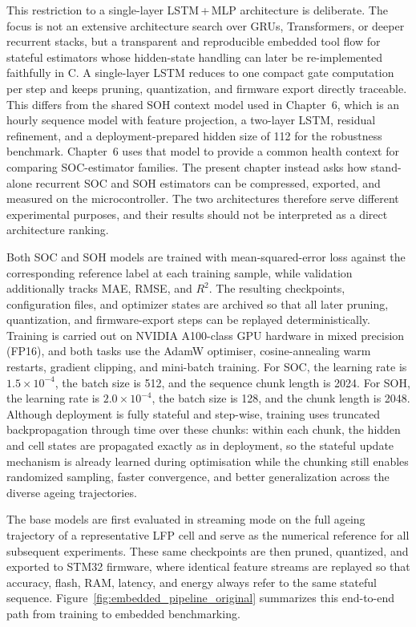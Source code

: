 \documentclass[
    a4paper,
    12pt,
    titlepage,
    bibliography=totoc,
    twoside=on,
    parskip=false,
    numbers=noenddot,
    cleardoublepage=empty,
    DIV=12,
    BCOR=12.0mm,
    headheight=36pt,
    headings=openright
]{scrreprt}
\begin{document}
This restriction to a single-layer LSTM\,+\,MLP architecture is deliberate. The focus is not an extensive architecture search over GRUs, Transformers, or deeper recurrent stacks, but a transparent and reproducible embedded tool flow for stateful estimators whose hidden-state handling can later be re-implemented faithfully in C. A single-layer LSTM reduces to one compact gate computation per step and keeps pruning, quantization, and firmware export directly traceable. This differs from the shared SOH context model used in Chapter~6, which is an hourly sequence model with feature projection, a two-layer LSTM, residual refinement, and a deployment-prepared hidden size of 112 for the robustness benchmark. Chapter~6 uses that model to provide a common health context for comparing SOC-estimator families. The present chapter instead asks how stand-alone recurrent SOC and SOH estimators can be compressed, exported, and measured on the microcontroller. The two architectures therefore serve different experimental purposes, and their results should not be interpreted as a direct architecture ranking.

Both SOC and SOH models are trained with mean-squared-error loss against the corresponding reference label at each training sample, while validation additionally tracks MAE, RMSE, and $R^2$. The resulting checkpoints, configuration files, and optimizer states are archived so that all later pruning, quantization, and firmware-export steps can be replayed deterministically. Training is carried out on NVIDIA A100-class GPU hardware in mixed precision (FP16), and both tasks use the AdamW optimiser, cosine-annealing warm restarts, gradient clipping, and mini-batch training.\autocite{loshchilovDecoupledWeightDecay2017,loshchilovSGDRStochasticGradient2016,micikeviciusMixedPrecisionTraining2017,pascanuDifficultyTrainingRecurrent2012} For SOC, the learning rate is $1.5\times10^{-4}$, the batch size is 512, and the sequence chunk length is 2024. For SOH, the learning rate is $2.0\times10^{-4}$, the batch size is 128, and the chunk length is 2048. Although deployment is fully stateful and step-wise, training uses truncated backpropagation through time over these chunks: within each chunk, the hidden and cell states are propagated exactly as in deployment, so the stateful update mechanism is already learned during optimisation while the chunking still enables randomized sampling, faster convergence, and better generalization across the diverse ageing trajectories.

The base models are first evaluated in streaming mode on the full ageing trajectory of a representative LFP cell and serve as the numerical reference for all subsequent experiments. These same checkpoints are then pruned, quantized, and exported to STM32 firmware, where identical feature streams are replayed so that accuracy, flash, RAM, latency, and energy always refer to the same stateful sequence. Figure~\ref{fig:embedded_pipeline_original} summarizes this end-to-end path from training to embedded benchmarking.
\end{document}
